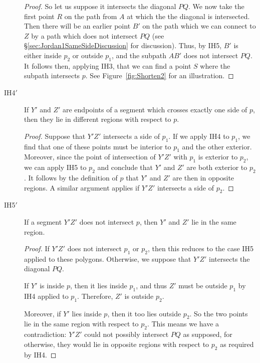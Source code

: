 \begin{description}
\begin{proof}
So let us suppose it intersects the diagonal $PQ$. We now take the first point $R$ on the path from $A$ at which the the diagonal is intersected. Then there will be an earlier point $B'$ on the path which we can connect to $Z$ by a path which does not intersect $PQ$ (see \S\ref{sec:Jordan1SameSideDiscussion} for discussion). Thus, by IH5, $B'$ is either inside $p_2$ or outside $p_1$, and the subpath $AB'$ does not intersect $PQ$. It follows then, applying IH3, that we can find a point $S$ where the subpath intersects $p$. See Figure~\ref{fig:Shorten2} for an illustration.
  \end{proof}

\item[IH4$'$] If $Y'$ and $Z'$ are endpoints of a segment which crosses exactly one side of $p$, then they lie in different regions with respect to $p$.
  \begin{proof}
     Suppose that $Y'Z'$ intersects a side of $p_1$. If we apply IH4 to $p_1$, we find that one of these points must be interior to $p_1$ and the other exterior. Moreover, since the point of intersection of $Y'Z'$ with $p_1$ is exterior to $p_2$, we can apply IH5 to $p_2$ and conclude that $Y'$ and $Z'$ are both exterior to $p_2$. It follows by the definition of $p$ that $Y'$ and $Z'$ are then in opposite regions. A similar argument applies if $Y'Z'$ intersects a side of $p_2$.
  \end{proof}
\item[IH5$'$] If a segment $Y'Z'$ does not intersect $p$, then $Y'$ and $Z'$ lie in the same region.
  \begin{proof}
    If $Y'Z'$ does not intersect $p_1$ or $p_2$, then this reduces to the case IH5 applied to these polygons. Otherwise, we suppose that $Y'Z'$ intersects the diagonal $PQ$. 

    If $Y'$ is inside $p$, then it lies inside $p_1$, and thus $Z'$ must be outside $p_1$ by IH4 applied to $p_1$. Therefore, $Z'$ is outside $p_2$. 

Moreover, if $Y'$ lies inside $p$, then it too lies outside $p_2$. So the two points lie in the same region with respect to $p_2$. This means we have a contradiction: $Y'Z'$ could not possibly intersect $PQ$ as supposed, for otherwise, they would lie in opposite regions with respect to $p_2$ as required by IH4.


\end{proof}
\end{description}
